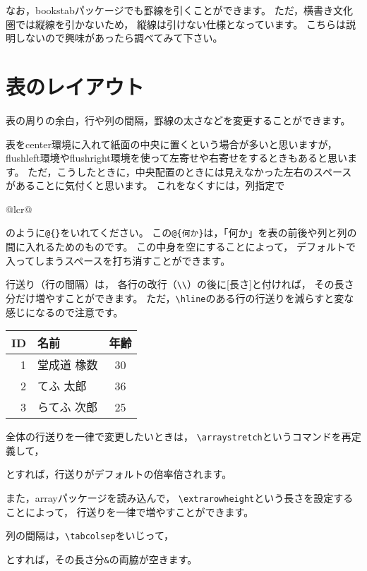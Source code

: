 \documentclass[class=jreport, crop=false, preview=false, dvipdfmx, fleqn]{standalone}
\begin{document}
なお，bookstabパッケージでも罫線を引くことができます。
ただ，横書き文化圏では縦線を引かないため，
縦線は引けない仕様となっています。
こちらは説明しないので興味があったら調べてみて下さい。



\section{表のレイアウト}
表の周りの余白，行や列の間隔，罫線の太さなどを変更することができます。

表をcenter環境に入れて紙面の中央に置くという場合が多いと思いますが，
flushleft環境やflushright環境を使って左寄せや右寄せをするときもあると思います。
ただ，こうしたときに，中央配置のときには見えなかった左右のスペースがあることに気付くと思います。
これをなくすには，列指定で
\begin{ITeX}
{@{}lcr@{}}
\end{ITeX}
のように\verb|@{}|をいれてください。
この\verb|@{何か}|は，「何か」を表の前後や列と列の間に入れるためのものです。
この中身を空にすることによって，
デフォルトで入ってしまうスペースを打ち消すことができます。

行送り（行の間隔）は，
各行の改行（\verb|\\|）の後に[長さ]と付ければ，
その長さ分だけ増やすことができます。
ただ，\verb|\hline|のある行の行送りを減らすと変な感じになるので注意です。
\begin{IOTeX}
\begin{tabular}{|r|l|c|} \hline
ID & 名前 & 年齢 \\ \hline
1 & 堂成道 橡数 & 30 \\ [10pt]
2 & てふ 太郎 & 36 \\
3 & らてふ 次郎 & 25 \\ \hline
\end{tabular}
\end{IOTeX}

全体の行送りを一律で変更したいときは，
\verb|\arraystretch|というコマンドを再定義して，
\begin{ITeX}
\renewcommand{\arrastretch}{倍率}
\end{ITeX}
とすれば，行送りがデフォルトの倍率倍されます。

また，arrayパッケージを読み込んで，
\verb|\extrarowheight|という長さを設定することによって，
行送りを一律で増やすことができます。
\begin{ITeX}
\setlength{\extrarowheight}{長さ}
\end{ITeX}

列の間隔は，\verb|\tabcolsep|をいじって，
\begin{ITeX}
\setlength{\tabcolsep}{長さ}
\end{ITeX}
とすれば，その長さ分\verb|&|の両脇が空きます。
\end{document}
